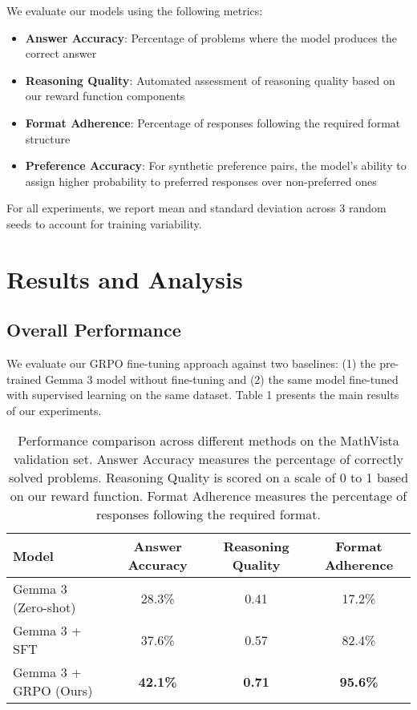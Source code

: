 \documentclass[11pt,a4paper]{article}
\begin{document}
We evaluate our models using the following metrics:

\begin{itemize}
    \item \textbf{Answer Accuracy}: Percentage of problems where the model produces the correct answer
    \item \textbf{Reasoning Quality}: Automated assessment of reasoning quality based on our reward function components
    \item \textbf{Format Adherence}: Percentage of responses following the required format structure
    \item \textbf{Preference Accuracy}: For synthetic preference pairs, the model's ability to assign higher probability to preferred responses over non-preferred ones
\end{itemize}

For all experiments, we report mean and standard deviation across 3 random seeds to account for training variability.

\section{Results and Analysis}

\subsection{Overall Performance}

We evaluate our GRPO fine-tuning approach against two baselines: (1) the pre-trained Gemma 3 model without fine-tuning and (2) the same model fine-tuned with supervised learning on the same dataset. Table 1 presents the main results of our experiments.

\begin{table}[h]
\centering
\begin{tabular}{lccc}
\toprule
\textbf{Model} & \textbf{Answer Accuracy} & \textbf{Reasoning Quality} & \textbf{Format Adherence} \\
\midrule
Gemma 3 (Zero-shot) & 28.3\% & 0.41 & 17.2\% \\
Gemma 3 + SFT & 37.6\% & 0.57 & 82.4\% \\
Gemma 3 + GRPO (Ours) & \textbf{42.1\%} & \textbf{0.71} & \textbf{95.6\%} \\
\bottomrule
\end{tabular}
\caption{Performance comparison across different methods on the MathVista validation set. Answer Accuracy measures the percentage of correctly solved problems. Reasoning Quality is scored on a scale of 0 to 1 based on our reward function. Format Adherence measures the percentage of responses following the required format.}
\label{tab:main_results}
\end{table}
\end{document}
